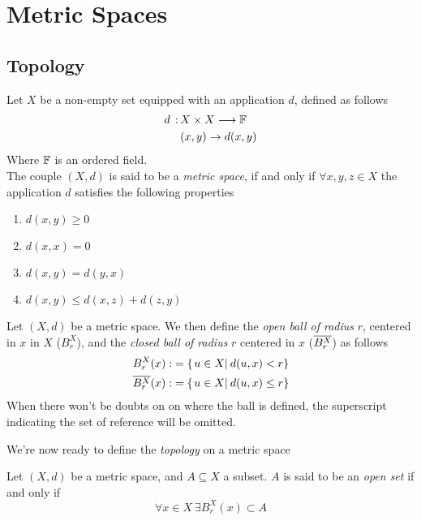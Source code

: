 \documentclass[../complete.tex]{subfiles}
\begin{document}
\section{Metric Spaces}
\subsection{Topology}
\begin{dfn}
	Let $X$ be a non-empty set equipped with an application $d$, defined as follows
	\begin{equation}
		\begin{aligned}
			d\, :\, &X\times X\overset{}{\longrightarrow}\mathbb{F}\\
			&(x,y)\to d(x,y)
		\end{aligned}
		\label{eq:distdef}
	\end{equation}
	Where $\mathbb{F}$ is an ordered field.\\
	The couple $(X,d)$ is said to be a \textit{metric space}, if and only if $\forall x,y,z\in X$ the application $d$ satisfies the following properties
	\begin{enumerate}
	\item $d(x,y)\ge0$
	\item $d(x,x)=0$
	\item $d(x,y)=d(y,x)$
	\item $d(x,y)\le  d(x,z)+d(z,y)$
	\end{enumerate}
\end{dfn}
\begin{dfn}[Ball]
	Let $(X,d)$ be a metric space. We then define the \textit{open ball of radius} $r$, centered in $x$ in $X$ ($B_r^X$), and the \textit{closed ball of radius} $r$ centered in $x$ ($\overline{B_r^X}$) as follows
	\begin{equation}
		\begin{aligned}
			B_r^X(x):&=\{\left.u\in X\right|_{}d(u,x)<r\}\\
			\overline{B_r^X}(x):&=\{\left.u\in X\right|_{}d(u,x)\le r\}
		\end{aligned}
		\label{eq:openclosedball}
	\end{equation}
	When there won't be doubts on on where the ball is defined, the superscript indicating the set of reference will be omitted.
\end{dfn}
We're now ready to define the \textit{topology} on a metric space
\begin{dfn}
	Let $(X,d)$ be a metric space, and $A\subseteq X$ a subset. $A$ is said to be an \textit{open set} if and only if
	\begin{equation}
		\forall x\in X\ \exists B_r^X(x)\subset A
		\label{eq:opensetdef}
	\end{equation}
\end{dfn}
\end{document}
